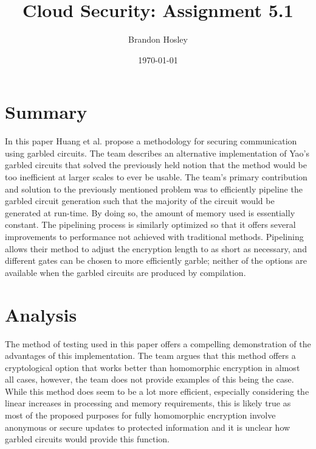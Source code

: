 \documentclass[]{article}
\title{Cloud Security: Assignment 5.1}
\author{Brandon Hosley}
\date{\today}
\begin{document}
	\maketitle
	
\section{Summary} 

In this paper\cite{Huang2011} Huang et al. propose a methodology for securing communication using garbled circuits.
The team describes an alternative implementation of Yao's garbled circuits that solved the previously held notion that the method would be too inefficient at larger scales to ever be usable.
The team's primary contribution and solution to the previously mentioned problem was to efficiently pipeline the garbled circuit generation such that the majority of the circuit would be generated at run-time.
By doing so, the amount of memory used is essentially constant.
The pipelining process is similarly optimized so that it offers several improvements to performance not achieved with traditional methods.
Pipelining allows their method to adjust the encryption length to as short as necessary,
and different gates can be chosen to more efficiently garble;
neither of the options are available when the garbled circuits are produced by compilation.


\section{Analysis}

The method of testing used in this paper offers a compelling demonstration of the advantages of this implementation.
The team argues that this method offers a cryptological option that works better than homomorphic encryption in almost all cases,
however, the team does not provide examples of this being the case.
While this method does seem to be a lot more efficient, especially considering the linear increases in processing and memory requirements,
this is likely true as most of the proposed purposes for fully homomorphic encryption involve anonymous or secure updates to protected information and it is unclear how garbled circuits would provide this function.


\clearpage


\end{document}
